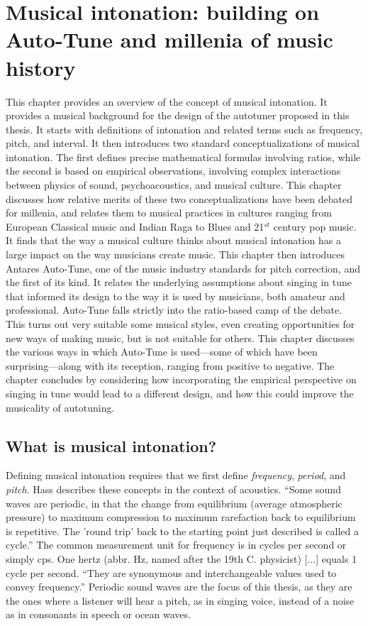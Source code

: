 \chapter{Musical intonation: building on Auto-Tune and millenia of music history}
\label{chap:intonation}
This chapter provides an overview of the concept of musical intonation. It provides a musical background for the design of the autotuner proposed in this thesis. It starts with definitions of intonation and related terms such as frequency, pitch, and interval. It then introduces two standard conceptualizations of musical intonation. The first defines precise mathematical formulas involving ratios, while the second is based on empirical observations, involving complex interactions between physics of sound, psychoacoustics, and musical culture. This chapter discusses how relative merits of these two conceptualizations have been debated for millenia, and relates them to musical practices in cultures ranging from European Classical music and Indian Raga to Blues and 21$^{st}$ century pop music. It finds that the way a musical culture thinks about musical intonation has a large impact on the way musicians create music. This chapter then introduces Antares Auto-Tune, one of the music industry standards for pitch correction, and the first of its kind. It relates the underlying assumptions about singing in tune that informed its design to the way it is used by musicians, both amateur and professional. Auto-Tune falls strictly into the ratio-based camp of the debate. This turns out very suitable some musical styles, even creating opportunities for new ways of making music, but is not suitable for others. This chapter discusses the various ways in which Auto-Tune is used---some of which have been surprising---along with its reception, ranging from positive to negative. The chapter concludes by considering how incorporating the empirical perspective on singing in tune would lead to a different design, and how this could improve the musicality of autotuning. 

\section{What is musical intonation?} 
Defining musical intonation requires that we first define \textit{frequency}, \textit{period}, and \textit{pitch}. Hass describes these concepts in the context of acoustics. ``Some sound waves are periodic, in that the change from equilibrium (average atmospheric pressure) to maximum compression to maximum rarefaction back to equilibrium is repetitive. The 'round trip' back to the starting point just described is called a cycle.'' The common measurement unit for frequency is in cycles per second or simply cps. One hertz (abbr. Hz, named after the 19th C. physicist) [...] equals 1 cycle per second. ``They are synonymous and interchangeable values used to convey frequency.'' \cite[][Ch.~1, Sec.~4--5]{hass2019introduction} Periodic sound waves are the focus of this thesis, as they are the ones where a listener will hear a pitch, as in singing voice, instead of a noise as in consonants in speech or ocean waves. 

